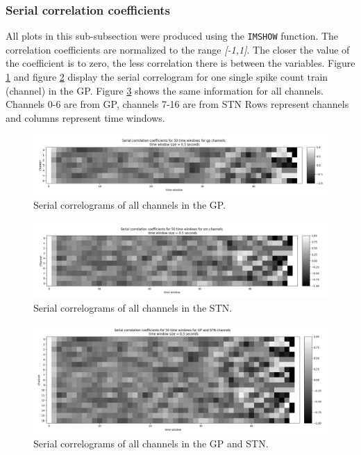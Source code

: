 \documentclass{article}
\begin{document}
\subsubsection{Serial correlation coefficients}

All plots in this sub-subsection were produced using the \texttt{IMSHOW} function. 
The correlation coefficients are normalized to the range \textit{[-1,1]}.  
The closer the value of the coefficient is to zero, the less correlation there is between the variables.
Figure \ref{fig:corr1} and figure \ref{fig:corr2} display the serial correlogram for one single spike count train (channel) in the GP. 
Figure \ref{fig:corr3} shows the same information for all channels. Channels 0-6 are from GP, channels 7-16 are from STN
Rows represent channels and columns represent time windows.

\begin{figure}[H]
    \centering
    \centerline{\includegraphics[width=1\textwidth]{images/spiking/autocorr_gp.png}}
    \caption{Serial correlograms of all channels in the GP.}
    \label{fig:corr1}
\end{figure}

\begin{figure}[H]
    \centering
    \centerline{\includegraphics[width=1\textwidth]{images/spiking/autocorr_stn.png}}
    \caption{Serial correlograms of all channels in the STN.}
    \label{fig:corr2}
\end{figure}

\begin{figure}[H]
    \centering
    \centerline{\includegraphics[width=1\textwidth]{images/spiking/autocorr_all.png}}
    \caption{Serial correlograms of all channels in the GP and STN.}
    \label{fig:corr3}
\end{figure}
\end{document}
